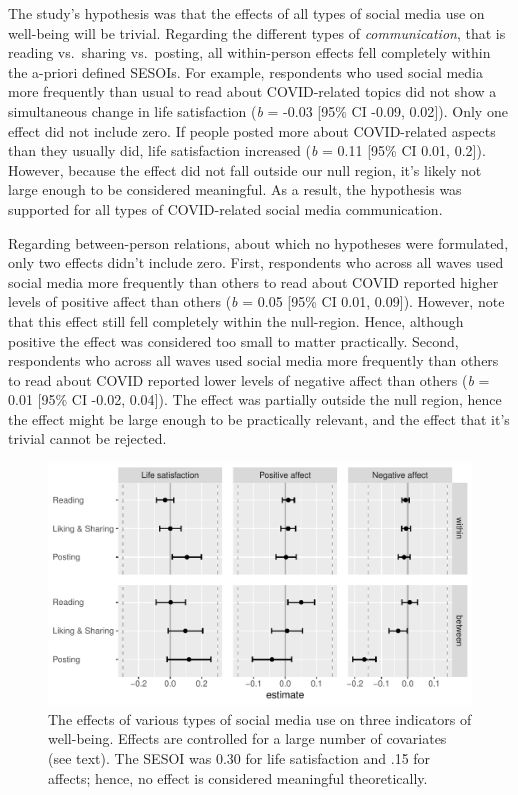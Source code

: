 \documentclass[
  english,
  man,floatsintext]{apa6}
\begin{document}
The study's hypothesis was that the effects of all types of social media use on well-being will be trivial.
Regarding the different types of \emph{communication}, that is reading vs.~sharing vs.~posting, all within-person effects fell completely within the a-priori defined SESOIs.
For example, respondents who used social media more frequently than usual to read about COVID-related topics did not show a simultaneous change in life satisfaction (\emph{b} = -0.03 {[}95\% CI -0.09, 0.02{]}).
Only one effect did not include zero.
If people posted more about COVID-related aspects than they usually did, life satisfaction increased (\emph{b} = 0.11 {[}95\% CI 0.01, 0.2{]}).
However, because the effect did not fall outside our null region, it's likely not large enough to be considered meaningful.
As a result, the hypothesis was supported for all types of COVID-related social media communication.

Regarding between-person relations, about which no hypotheses were formulated, only two effects didn't include zero.
First, respondents who across all waves used social media more frequently than others to read about COVID reported higher levels of positive affect than others (\emph{b} = 0.05 {[}95\% CI 0.01, 0.09{]}).
However, note that this effect still fell completely within the null-region.
Hence, although positive the effect was considered too small to matter practically.
Second, respondents who across all waves used social media more frequently than others to read about COVID reported lower levels of negative affect than others (\emph{b} = 0.01 {[}95\% CI -0.02, 0.04{]}).
The effect was partially outside the null region, hence the effect might be large enough to be practically relevant, and the effect that it's trivial cannot be rejected.

\begin{figure}[!h]
\includegraphics[width=\textwidth]{figures/fig_results_activity} \caption{The effects of various types of social media use on three indicators of well-being. Effects are controlled for a large number of covariates (see text). The SESOI was 0.30 for life satisfaction and .15 for affects; hence, no effect is considered meaningful theoretically.}\label{fig:fig-res-activity}
\end{figure}
\end{document}
